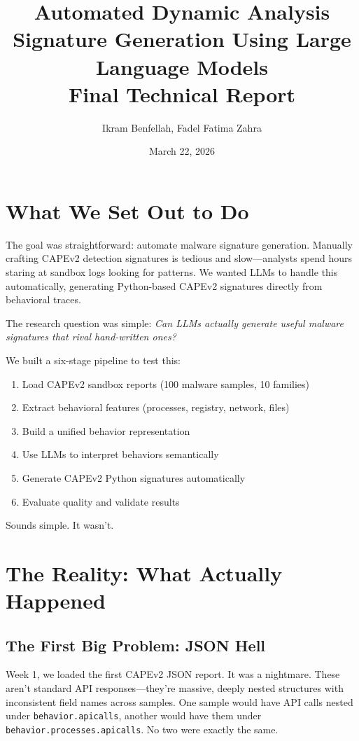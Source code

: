 \documentclass[11pt]{article}
\title{\textbf{Automated Dynamic Analysis Signature Generation Using Large Language Models}\\
\large Final Technical Report}
\author{Ikram Benfellah, Fadel Fatima Zahra}
\date{March 22, 2026}
\begin{document}
\maketitle

\section{What We Set Out to Do}

The goal was straightforward: automate malware signature generation. Manually crafting CAPEv2 detection signatures is tedious and slow—analysts spend hours staring at sandbox logs looking for patterns. We wanted LLMs to handle this automatically, generating Python-based CAPEv2 signatures directly from behavioral traces.

The research question was simple: \textit{Can LLMs actually generate useful malware signatures that rival hand-written ones?}

We built a six-stage pipeline to test this:
\begin{enumerate}
    \item Load CAPEv2 sandbox reports (100 malware samples, 10 families)
    \item Extract behavioral features (processes, registry, network, files)
    \item Build a unified behavior representation
    \item Use LLMs to interpret behaviors semantically
    \item Generate CAPEv2 Python signatures automatically
    \item Evaluate quality and validate results
\end{enumerate}

Sounds simple. It wasn't.

\section{The Reality: What Actually Happened}

\subsection{The First Big Problem: JSON Hell}

Week 1, we loaded the first CAPEv2 JSON report. It was a nightmare. These aren't standard API responses—they're massive, deeply nested structures with inconsistent field names across samples. One sample would have API calls nested under \texttt{behavior.apicalls}, another would have them under \texttt{behavior.processes.apicalls}. No two were exactly the same.
\end{document}
